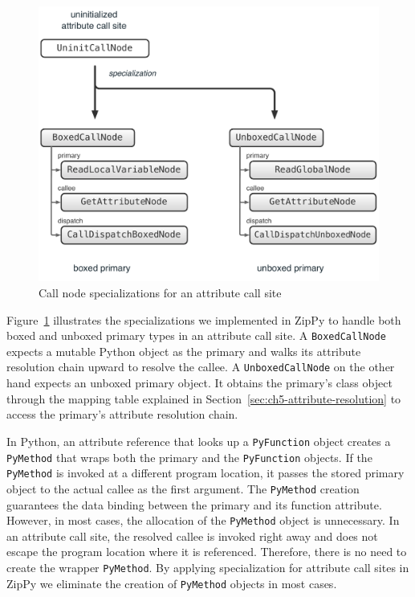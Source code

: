 \begin{figure}
\centering
\includegraphics[scale=.5]{figures/ch5-call-node-specialization-attribute}
\caption{Call node specializations for an attribute call site}
\label{fig:ch5-call-node-specialization-attribute}
\end{figure}

Figure~\ref{fig:ch5-call-node-specialization-attribute} illustrates the specializations we implemented in ZipPy to handle both boxed and unboxed primary types in an attribute call site.
A \texttt{BoxedCallNode} expects a mutable Python object as the primary and walks its attribute resolution chain upward to resolve the callee.
A \texttt{UnboxedCallNode} on the other hand expects an unboxed primary object.
It obtains the primary's class object through the mapping table explained in Section~\ref{sec:ch5-attribute-resolution} to access the primary's attribute resolution chain.

In Python, an attribute reference that looks up a \texttt{PyFunction} object creates a \texttt{PyMethod} that wraps both the primary and the \texttt{PyFunction} objects.
If the \texttt{PyMethod} is invoked at a different program location, it passes the stored primary object to the actual callee as the first argument.
The \texttt{PyMethod} creation guarantees the data binding between the primary and its function attribute.
However, in most cases, the allocation of the \texttt{PyMethod} object is unnecessary.
In an attribute call site, the resolved callee is invoked right away and does not escape the program location where it is referenced.
Therefore, there is no need to create the wrapper \texttt{PyMethod}.
By applying specialization for attribute call sites in ZipPy we eliminate the creation of \texttt{PyMethod} objects in most cases.

